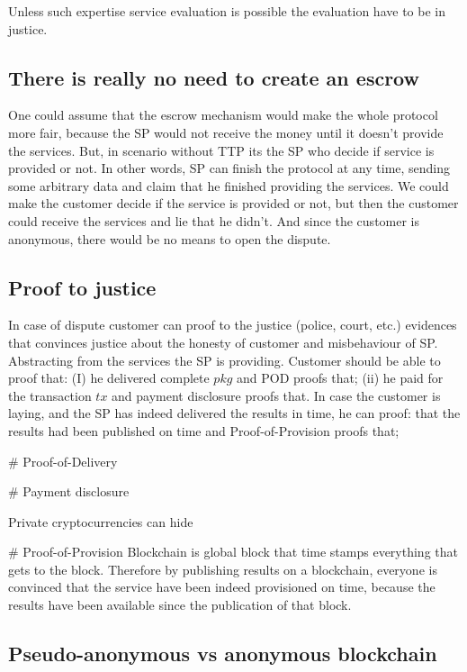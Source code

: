 \documentclass{article}
\begin{document}
Unless such expertise service evaluation is possible the evaluation have to be in justice. 



\subsection{There is really no need to create an escrow}
One could assume that the escrow mechanism would make the whole protocol more fair, because the SP would not receive the money until it doesn't provide the services. But, in scenario without TTP its the SP who decide if service is provided or not. In other words, SP can finish the protocol at any time, sending some arbitrary data and claim that he finished providing the services. We could make the customer decide if the service is provided or not, but then the customer could receive the services and lie that he didn't. And since the customer is anonymous, there would be no means to open the dispute.


\subsection{Proof to justice}
In case of dispute customer can proof to the justice (police, court, etc.) evidences that convinces justice about the honesty of customer and misbehaviour of SP. Abstracting from the services the SP is providing. Customer should be able to proof that: (I) he delivered complete $pkg$ and POD proofs that; (ii) he paid for the transaction $tx$ and payment disclosure proofs that.
In case the customer is laying, and the SP has indeed delivered the results in time, he can proof: that the results had been published on time and Proof-of-Provision proofs that;


# Proof-of-Delivery

# Payment disclosure

Private cryptocurrencies can hide

# Proof-of-Provision
Blockchain is global block that time stamps everything that gets to the block. Therefore by publishing results on a blockchain, everyone is convinced that the service have been indeed provisioned on time, because the results have been available since the publication of that block. 


\subsection{Pseudo-anonymous vs anonymous blockchain}
\end{document}
